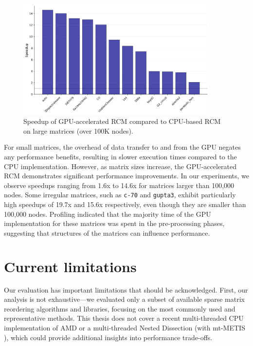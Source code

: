 \begin{figure}[H]
   \centering
   \includegraphics[width=0.9\textwidth]{fig/res/gpu_rcm_speedups_clean.png}
   \caption{Speedup of GPU-accelerated RCM compared to CPU-based RCM on large matrices (over 100K nodes).}
   \label{fig:gpu-rcm-speedups}
\end{figure}

For small matrices, the overhead of data transfer to and from the GPU negates any performance benefits, resulting in slower execution times compared to the CPU implementation. However, as matrix sizes increase, the GPU-accelerated RCM demonstrates significant performance improvements. In our experiments, we observe speedups ranging from 1.6x to 14.6x for matrices larger than 100,000 nodes. Some irregular matrices, such as \texttt{c-70} and \texttt{gupta3}, exhibit particularly high speedups of 19.7x and 15.6x respectively, even though they are smaller than 100,000 nodes. Profiling indicated that the majority time of the GPU implementation for these matrices was spent in the pre-processing phases, suggesting that structures of the matrices can influence performance.

\section{Current limitations}

Our evaluation has important limitations that should be acknowledged. First, our analysis is not exhaustive—we evaluated only a subset of available sparse matrix reordering algorithms and libraries, focusing on the most commonly used and representative methods. This thesis does not cover a recent multi-threaded CPU implementation of AMD \cite{chang2025parallelizingapproximateminimumdegree} or a multi-threaded Nested Dissection (with mt-METIS \cite{mtmetis2013ipdps}), which could provide additional insights into performance trade-offs.

